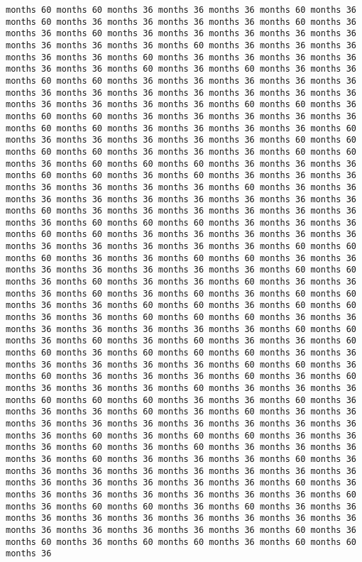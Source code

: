 \documentclass[11pt]{article}
\begin{document}
\begin{Verbatim}[commandchars=\\\{\}, frame=single, framerule=2mm, rulecolor=\color{outerrorbackground}]
months 60 months 60 months 36 months 36 months 36 months 60 months 36 months 60 months 36 months 36 months 36 months 36 months 60 months 36 months 36 months 60 months 36 months 36 months 36 months 36 months 36 months 36 months 36 months 36 months 60 months 36 months 36 months 36 months 36 months 36 months 60 months 36 months 36 months 36 months 36 months 36 months 36 months 60 months 36 months 60 months 36 months 36 months 60 months 60 months 36 months 36 months 36 months 36 months 36 months 36 months 36 months 36 months 36 months 36 months 36 months 36 months 36 months 36 months 36 months 36 months 60 months 60 months 36 months 60 months 60 months 36 months 36 months 36 months 36 months 36 months 60 months 60 months 36 months 36 months 36 months 36 months 60 months 36 months 36 months 36 months 36 months 36 months 60 months 60 months 60 months 60 months 36 months 36 months 36 months 60 months 60 months 36 months 60 months 60 months 60 months 36 months 36 months 36 months 60 months 60 months 36 months 60 months 36 months 36 months 36 months 36 months 36 months 36 months 36 months 60 months 36 months 36 months 36 months 36 months 36 months 36 months 36 months 36 months 36 months 60 months 36 months 36 months 36 months 36 months 36 months 36 months 36 months 60 months 60 months 60 months 36 months 36 months 36 months 60 months 60 months 36 months 36 months 36 months 36 months 36 months 36 months 36 months 36 months 36 months 36 months 60 months 60 months 60 months 36 months 36 months 60 months 60 months 36 months 36 months 36 months 36 months 36 months 36 months 36 months 60 months 60 months 36 months 60 months 36 months 36 months 60 months 36 months 36 months 36 months 60 months 36 months 60 months 36 months 60 months 60 months 36 months 36 months 60 months 60 months 36 months 60 months 60 months 36 months 36 months 60 months 60 months 60 months 36 months 36 months 36 months 36 months 36 months 36 months 36 months 60 months 60 months 36 months 60 months 36 months 60 months 36 months 36 months 60 months 60 months 36 months 60 months 60 months 60 months 36 months 36 months 36 months 36 months 36 months 36 months 60 months 60 months 36 months 60 months 36 months 36 months 36 months 60 months 36 months 60 months 36 months 36 months 36 months 60 months 36 months 36 months 36 months 60 months 60 months 60 months 36 months 36 months 60 months 36 months 36 months 36 months 60 months 36 months 60 months 36 months 36 months 36 months 36 months 36 months 36 months 36 months 36 months 36 months 36 months 60 months 36 months 60 months 60 months 36 months 36 months 36 months 60 months 36 months 60 months 36 months 36 months 36 months 36 months 60 months 36 months 36 months 36 months 60 months 36 months 36 months 36 months 36 months 36 months 36 months 36 months 36 months 36 months 36 months 36 months 36 months 36 months 60 months 36 months 36 months 36 months 36 months 36 months 36 months 36 months 60 months 36 months 60 months 60 months 36 months 60 months 36 months 36 months 36 months 36 months 36 months 36 months 36 months 36 months 36 months 36 months 36 months 36 months 36 months 36 months 60 months 36 months 60 months 36 months 60 months 60 months 36 months 60 months 60 months 36 
\end{Verbatim}
\end{document}
